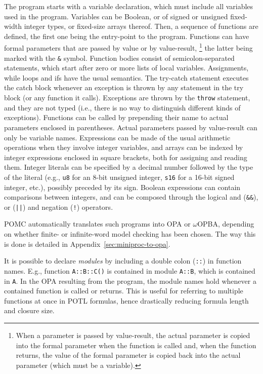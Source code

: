\documentclass[9pt,a4paper]{article}
\begin{document}
The program starts with a variable declaration, which must include all variables used in the program.
Variables can be Boolean, or of signed or unsigned fixed-width integer types,
or fixed-size arrays thereof.
Then, a sequence of functions are defined, the first one being the entry-point to the program.
Functions can have formal parameters that are passed by value or by value-result,%
\footnote{When a parameter is passed by value-result, the actual parameter is copied into
the formal parameter when the function is called and,
when the function returns, the value of the formal parameter
is copied back into the actual parameter (which must be a variable).}
the latter being marked with the \texttt{\&} symbol.
Function bodies consist of semicolon-separated statements,
which start after zero or more lists of local variables.
Assignments, while loops and ifs have the usual semantics.
The try-catch statement executes the catch block whenever an exception is thrown by any statement
in the try block (or any function it calls).
Exceptions are thrown by the \texttt{throw} statement, and they are not typed
(i.e., there is no way to distinguish different kinds of exceptions).
Functions can be called by prepending their name to actual parameters enclosed in parentheses.
Actual parameters passed by value-result can only be variable names.
Expressions can be made of the usual arithmetic operations when they involve integer variables,
and arrays can be indexed by integer expressions enclosed in square brackets,
both for assigning and reading them.
Integer literals can be specified by a decimal number followed by the type of the literal
(e.g., \texttt{u8} for an 8-bit unsigned integer,
\texttt{s16} for a 16-bit signed integer, etc.),
possibly preceded by its sign.
Boolean expressions can contain comparisons between integers,
and can be composed through the logical and (\texttt{\&\&}),
or (\texttt{||}) and negation (\texttt{!}) operators.

POMC automatically translates such programs into OPA or $\omega$OPBA,
depending on whether finite- or infinite-word model checking has been chosen.
The way this is done is detailed in Appendix~\ref{sec:miniproc-to-opa}.

It is possible to declare \emph{modules} by including a double colon (\texttt{::})
in function names. E.g., function \texttt{A::B::C()} is contained in module \texttt{A::B},
which is contained in \texttt{A}. In the OPA resulting from the program, the module
names hold whenever a contained function is called or returns.
This is useful for referring to multiple functions at once in POTL formulas, hence drastically
reducing formula length and closure size.
\end{document}
